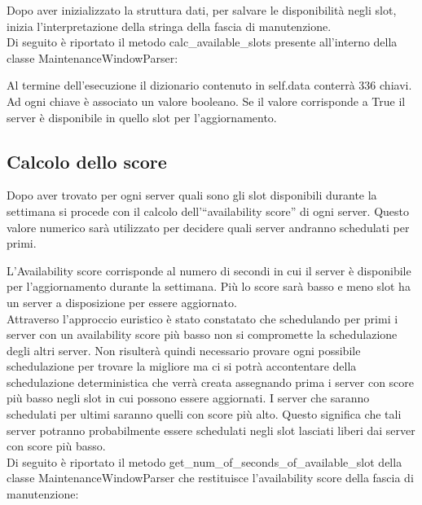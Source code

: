 Dopo aver inizializzato la struttura dati, per salvare le disponibilità negli 
slot, inizia l’interpretazione della stringa della fascia di manutenzione.\\

Di seguito è riportato il metodo calc\_available\_slots presente all'interno della classe MaintenanceWindowParser:



Al termine dell’esecuzione il dizionario contenuto in self.data conterrà 336 chiavi. 
Ad ogni chiave è associato un valore booleano. Se il valore corrisponde a True il 
server è disponibile in quello slot per l’aggiornamento.


\subsection{Calcolo dello score}
Dopo aver trovato per ogni server quali sono gli slot disponibili durante la 
settimana si procede con il calcolo dell’“availability score” di ogni server. 
Questo valore numerico sarà utilizzato per decidere quali server andranno schedulati per primi.

L'Availability score corrisponde al numero di secondi in cui il server è disponibile 
per l’aggiornamento durante la settimana.
Più lo score sarà basso e meno slot ha un server a disposizione per essere aggiornato.\\

Attraverso l’approccio euristico è stato constatato che schedulando per primi i 
server con un availability score più basso non si compromette la schedulazione degli 
altri server. Non risulterà quindi necessario provare ogni possibile schedulazione 
per trovare la migliore ma ci si potrà accontentare della schedulazione deterministica 
che verrà creata assegnando prima i server con score più basso negli slot in cui 
possono essere aggiornati.
I server che saranno schedulati per ultimi saranno quelli con score più alto.
Questo significa che tali server potranno probabilmente essere schedulati 
negli slot lasciati liberi dai server con score più basso.\\


Di seguito è riportato il metodo get\_num\_of\_seconds\_of\_available\_slot della 
classe MaintenanceWindowParser che restituisce l'availability score della fascia di manutenzione:





